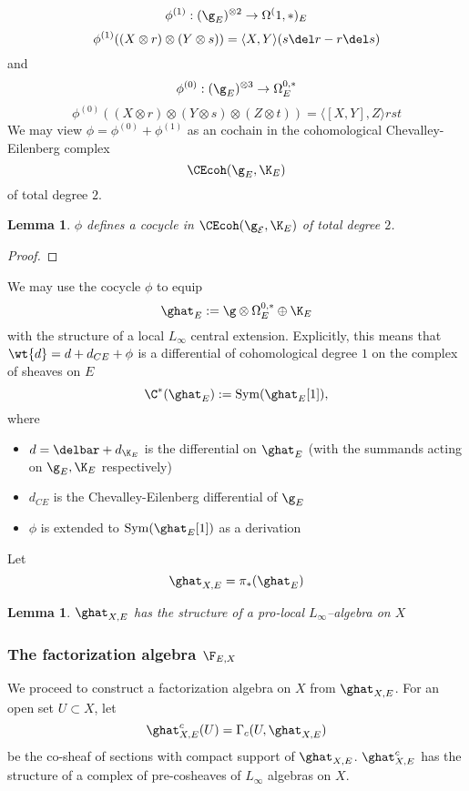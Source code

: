 \documentclass[12pt]{amsart}
\newtheorem{lemma}[theorem]{Lemma}
\theoremstyle{definition}
\theoremstyle{remark}
\newcommand{\on}{\operatorname}
\newcommand{\E}{{\mathcal E}}
\begin{document}
$$ \phi^{(1)}: (\g_{E})^{\otimes 2} \rightarrow \Omega^(1,*)_{E} $$
$$ \phi^{(1)} ((X \otimes r) \otimes (Y \otimes s)) = \langle X, Y \rangle (s \del r - r \del s) $$
and 
$$ \phi^{(0)}: (\g_{E})^{\otimes 3} \rightarrow \Omega^{0,*}_E $$
$$ \phi^{(0)}( (X \otimes r)\otimes(Y \otimes s) \otimes (Z \otimes t)) = \langle [X,Y], Z \rangle rst $$
We may view $\phi = \phi^{(0)} + \phi^{(1)}$ as an cochain in the cohomological Chevalley-Eilenberg complex $$ \CEcoh(\g_{E}, \K_{E}) $$ of total degree $2$.

\begin{lemma}
$\phi$ defines a cocycle in $\CEcoh(\g_{\E}, \K_{E}) $ of total degree $2$.
\end{lemma}
\begin{proof}

\end{proof}

We may use the cocycle $\phi$ to equip 
\begin{equation}
\ghat_{E} := \g \otimes \Omega^{0,*}_E \oplus \K_{E}
\end{equation}
with the structure of a local $L_{\infty}$ central extension. Explicitly, this means that $\wt{d} = d + d_{CE} + \phi$ is a differential of cohomological degree $1$ on the complex of sheaves on $E$
\[
\C^{*}(\ghat_E) := \on{Sym}(\ghat_E[1]),
\]
where 
\begin{itemize}
\item $d = \delbar + d_{\K_E}$ is the differential on $\ghat_E$ (with the summands acting on $\g_E, \K_E$ respectively)
\item $d_{CE}$ is the Chevalley-Eilenberg differential of $\g_E$
\item $\phi$ is extended to $\on{Sym}(\ghat_E[1])$ as a derivation
\end{itemize}

Let 
\begin{equation}
\ghat_{X,E} = \pi_*(\ghat_E)
\end{equation}


\begin{lemma}
$\ghat_{X,E}$ has the structure of a pro-local $L_{\infty}$--algebra on $X$
\end{lemma}

\subsubsection{The factorization algebra $\F_{E,X}$}

We proceed to construct a factorization algebra on $X$ from $\ghat_{X,E}$. For an open set $U \subset X$, let
\begin{equation}
\ghat^c_{X,E}(U) = \Gamma_c (U, \ghat_{X,E})
\end{equation}
be the co-sheaf of sections with compact support of $\ghat_{X,E}$. $\ghat^c_{X,E}$ has the structure of a complex of pre-cosheaves of $L_{\infty}$ algebras on $X$. 
\end{document}
